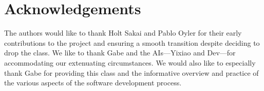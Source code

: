 \documentclass{article}
\begin{document}
\section{Acknowledgements}
The authors would like to thank Holt Sakai and Pablo Oyler for their early contributions to the project and ensuring a smooth transition despite deciding to drop the class.  We like to thank Gabe and the AIs---Yixiao and Dev---for accommodating our extenuating circumstances.  We would also like to especially thank Gabe for providing this class and the informative overview and practice of the various aspects of the software development process.
\end{document}
